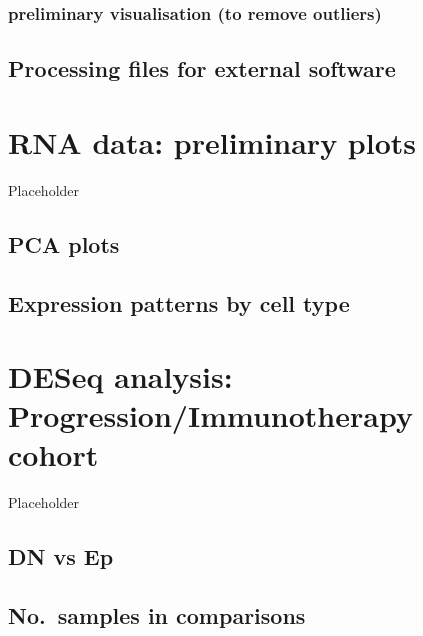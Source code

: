 \documentclass[
]{book}
\begin{document}
\hypertarget{preliminary-visualisation-to-remove-outliers}{%
\subsection{preliminary visualisation (to remove outliers)}\label{preliminary-visualisation-to-remove-outliers}}

\hypertarget{processing-files-for-external-software}{%
\section{Processing files for external software}\label{processing-files-for-external-software}}

\hypertarget{rna-data-preliminary-plots}{%
\chapter{RNA data: preliminary plots}\label{rna-data-preliminary-plots}}

Placeholder

\hypertarget{pca-plots}{%
\section{PCA plots}\label{pca-plots}}

\hypertarget{expression-patterns-by-cell-type}{%
\section{Expression patterns by cell type}\label{expression-patterns-by-cell-type}}

\hypertarget{deseq-analysis-progressionimmunotherapy-cohort}{%
\chapter{DESeq analysis: Progression/Immunotherapy cohort}\label{deseq-analysis-progressionimmunotherapy-cohort}}

Placeholder

\hypertarget{dn-vs-ep}{%
\section{DN vs Ep}\label{dn-vs-ep}}

\hypertarget{no.-samples-in-comparisons}{%
\section{No.~samples in comparisons}\label{no.-samples-in-comparisons}}
\end{document}
